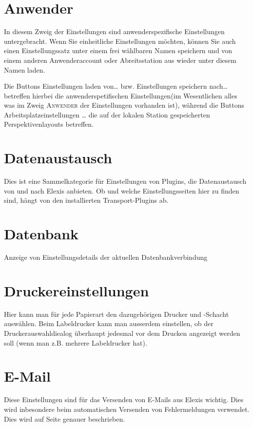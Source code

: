 \section{Anwender}
In diesem Zweig der Einstellungen sind anwenderspezifische Einstellungen
untergebracht. Wenn Sie einheitliche Einstellungen möchten, können Sie auch einen
Einstellungssatz unter einem frei wählbaren Namen speichern und von einem
anderen Anwenderaccount oder Abreitsstation aus wieder unter diesem Namen laden.

Die Buttons \glqq Einstellungen laden von\ldots\grqq{} bzw. \glqq Einstellungen
speichern nach\ldots\grqq{} betreffen hierbei die anwenderspetifischen
Einstellungen(im Wesentlichen alles was im Zweig \textsc{Anwender} der
Einstellungen vorhanden ist), während die Buttons \glqq
Arbeitsplatzeinstellungen \ldots\grqq{} die auf der lokalen Station
gespeicherten Perspektivenlayouts betreffen.
\section{Datenaustausch}
Dies ist eine Sammelkategorie für Einstellungen von Plugins, die Datenaustausch von und nach Elexis anbieten. Ob und welche Einstellungsseiten hier zu finden sind, hängt von den installierten Transport-Plugins ab.
\section{Datenbank}
Anzeige von Einstellungsdetails der aktuellen Datenbankverbindung
\section{Druckereinstellungen}
Hier kann man für jede Papierart den dazugehörigen Drucker und -Schacht auswählen. Beim Labeldrucker kann man ausserdem einstellen, ob der Druckerauswahldiealog überhaupt jedesmal vor dem Drucken angezeigt werden soll (wenn man z.B. mehrere Labeldrucker hat).
\section{E-Mail}
Diese Einstellungen sind für das Versenden von E-Mails aus Elexis wichtig. Dies wird inbesondere beim automatischen Versenden von Fehlermeldungen verwendet. Dies wird auf Seite \pageref{senderrors} genauer beschrieben.
